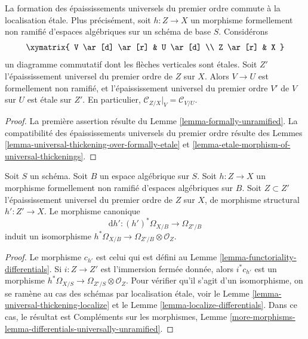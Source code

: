 \begin{lemma}
\label{lemma-universal-thickening-localize}
La formation des épaississements universels du premier ordre commute à la
localisation étale. Plus précisément, soit $h : Z \to X$ un morphisme formellement non ramifié
d'espaces algébriques sur un schéma de base $S$.
Considérons
$$
\xymatrix{
V \ar[d] \ar[r] & U \ar[d] \\
Z \ar[r] & X
}
$$
un diagramme commutatif dont les flèches verticales sont étales.
Soit $Z'$ l'épaississement universel du premier ordre de $Z$ sur $X$.
Alors $V \to U$ est formellement non ramifié, et l'épaississement universel du premier
ordre $V'$ de $V$ sur $U$ est étale sur $Z'$.
En particulier, $\mathcal{C}_{Z/X}|_V = \mathcal{C}_{V/U}$.
\end{lemma}

\begin{proof}
La première assertion résulte du
Lemme \ref{lemma-formally-unramified}.
La compatibilité des épaississements universels du premier ordre
résulte des
Lemmes \ref{lemma-universal-thickening-over-formally-etale} et
\ref{lemma-etale-morphism-of-universal-thickenings}.
\end{proof}

\begin{lemma}
\label{lemma-differentials-universally-unramified}
Soit $S$ un schéma. Soit $B$ un espace algébrique sur $S$.
Soit $h : Z \to X$ un morphisme formellement non ramifié d'espaces algébriques
sur $B$. Soit $Z \subset Z'$ l'épaississement universel du premier ordre de $Z$
sur $X$, de morphisme structural $h' : Z' \to X$. Le morphisme canonique
$$
\text{d}h' : (h')^*\Omega_{X/B} \to \Omega_{Z'/B}
$$
induit un isomorphisme
$h^*\Omega_{X/B} \to \Omega_{Z'/B} \otimes \mathcal{O}_Z$.
\end{lemma}

\begin{proof}
Le morphisme $c_{h'}$ est celui qui est défini au
Lemme \ref{lemma-functoriality-differentials}.
Si $i : Z \to Z'$ est l'immersion fermée donnée, alors
$i^*c_{h'}$ est un morphisme
$h^*\Omega_{X/S} \to \Omega_{Z'/S} \otimes \mathcal{O}_Z$.
Pour vérifier qu'il s'agit d'un isomorphisme, on se ramène au cas des schémas
par localisation étale, voir le
Lemme \ref{lemma-universal-thickening-localize}
et le
Lemme \ref{lemma-localize-differentials}.
Dans ce cas, le résultat est
Compléments sur les morphismes,
Lemme \ref{more-morphisms-lemma-differentials-universally-unramified}.
\end{proof}

